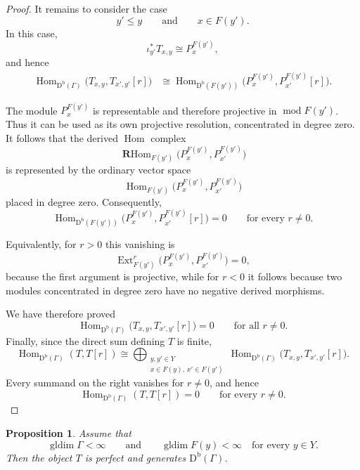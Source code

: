 \documentclass[12pt,a4paper,english,reqno]{amsart}
\theoremstyle{plain}
\newtheorem{proposition}[theorem]{Proposition}
\theoremstyle{definition}
\newcommand{\Db}{\mathrm D^{\mathrm b}}
\newcommand{\Hom}{\operatorname{Hom}}
\newcommand{\RHom}{\operatorname{\mathbf{R}Hom}}
\newcommand{\gldim}{\operatorname{gldim}}
\newcommand{\G}{\Gamma}
\newcommand{\modu}{\operatorname{mod}}
\newcommand{\Ext}{\operatorname{Ext}}
\begin{document}
\begin{proof}
It remains to consider the case
\[
y'\leq y
\qquad\text{and}\qquad
x\in F(y').
\]
In this case,
\[
\iota_{y'}^*T_{x,y}\cong P_x^{F(y')},
\]
and hence
\begin{align*}
\Hom_{\Db(\G)}
\bigl(T_{x,y},T_{x',y'}[r]\bigr)
&\cong
\Hom_{\Db(F(y'))}
\bigl(P_x^{F(y')},P_{x'}^{F(y')}[r]\bigr).
\end{align*}

The module $P_x^{F(y')}$ is representable and therefore projective in
$\modu F(y')$. Thus it can be used as its own projective resolution,
concentrated in degree zero. It follows that the derived $\Hom$ complex
\[
\RHom_{F(y')}
\bigl(P_x^{F(y')},P_{x'}^{F(y')}\bigr)
\]
is represented by the ordinary vector space
\[
\Hom_{F(y')}
\bigl(P_x^{F(y')},P_{x'}^{F(y')}\bigr)
\]
placed in degree zero. Consequently,
\[
\Hom_{\Db(F(y'))}
\bigl(P_x^{F(y')},P_{x'}^{F(y')}[r]\bigr)=0
\qquad
\text{for every }r\neq0.
\]

Equivalently, for $r>0$ this vanishing is
\[
\Ext_{F(y')}^r
\bigl(P_x^{F(y')},P_{x'}^{F(y')}\bigr)=0,
\]
because the first argument is projective, while for $r<0$ it follows
because two modules concentrated in degree zero have no negative
derived morphisms.

We have therefore proved
\[
\Hom_{\Db(\G)}
\bigl(T_{x,y},T_{x',y'}[r]\bigr)=0
\qquad
\text{for all }r\neq0.
\]
Finally, since the direct sum defining $T$ is finite,
\[
\Hom_{\Db(\G)}(T,T[r])
\cong
\bigoplus_{\substack{y,y'\in Y\\
x\in F(y),\,x'\in F(y')}}
\Hom_{\Db(\G)}
\bigl(T_{x,y},T_{x',y'}[r]\bigr).
\]
Every summand on the right vanishes for $r\neq0$, and hence
\[
\Hom_{\Db(\G)}(T,T[r])=0
\qquad
\text{for every }r\neq0.
\]
\end{proof}

\begin{proposition}
\label{prop:T-generates}
Assume that
\[
 \gldim\G<\infty
 \qquad\text{and}\qquad
 \gldim F(y)<\infty\quad\text{for every }y\in Y.
\]
Then the object $T$ is perfect and generates $\Db(\G)$.
\end{proposition}
\end{document}
